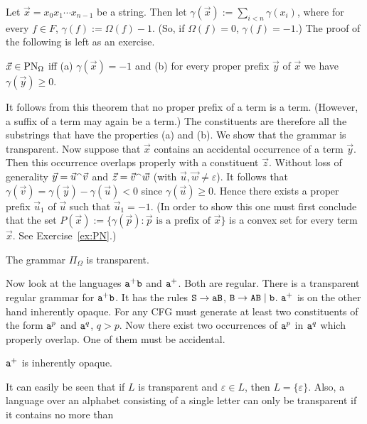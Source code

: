 Let $\vec{x} = x_0 x_1 \dotsb x_{n-1}$ be a string. Then let
$\gamma(\vec{x}) := \sum_{i < n} \gamma(x_i)$,
where for every $f \in F$, $\gamma(f) := \Omega(f) - 1$.
(So, if $\Omega(f) = 0$, $\gamma(f) = -1$.)
The proof of the following is left as an exercise. 
\begin{lem}
\label{lem:zahl}%
$\vec{x} \in \operatorname{PN}_{\Omega}$ iff (a) $\gamma(\vec{x}) = -1$ 
and (b) for every proper prefix $\vec{y}$ of $\vec{x}$ we have 
$\gamma(\vec{y}) \geq 0$.
\end{lem}
It follows from this theorem that no proper prefix of a
term is a term. (However, a suffix of a term may again be a term.) 
The constituents are therefore all the substrings that have the 
properties (a) and (b). We show that the grammar is transparent.
Now suppose that $\vec{x}$ contains an accidental occurrence of a 
term $\vec{y}$. Then this occurrence overlaps properly with a 
constituent $\vec{z}$. Without loss of generality $\vec{y} = 
\vec{u} {^{\smallfrown}} \vec{v}$ and $\vec{z} = \vec{v} {^{\smallfrown}} \vec{w}$ 
(with $\vec{u}, \vec{w} \neq \varepsilon$). It follows that
$\gamma(\vec{v}) = \gamma(\vec{y}) - \gamma(\vec{u})
< 0$ since $\gamma(\vec{u}) \geq 0$. Hence there exists a
proper prefix  $\vec{u}_1$ of $\vec{u}$ such that
$\vec{u}_1 = -1$. (In order to show this one must first conclude
that the set $P(\vec{x}) := \{\gamma(\vec{p}) : 
\vec{p} \mbox{ is a prefix of } \vec{x}\}$ is a convex set
for every term $\vec{x}$. See Exercise~\ref{ex:PN}.)
\begin{thm}
\label{thm:pn}
The grammar $\Pi_{\Omega}$ is transparent.
\proofend
\end{thm}
Now look at the languages $\mbox{\tt a}^+\mbox{\tt b}$ and
$\mbox{\tt a}^+$. Both are regular. There is a transparent 
regular grammar for $\mbox{\tt a}^+\mbox{\tt b}$. It has the rules 
$\mbox{\tt S} \rightarrow \mbox{\tt aB}$, $\mbox{\tt B} \rightarrow \mbox{\tt AB} 
\mid \mbox{\tt b}$. $\mbox{\tt a}^+$ is on the other hand inherently 
opaque.  For any CFG must generate at least two constituents of the  
form $\mbox{\tt a}^p$ and $\mbox{\tt a}^q$, $q > p$. 
Now there exist two occurrences of $\mbox{\tt a}^p$ in 
$\mbox{\tt a}^q$ which properly overlap. One of them must be
accidental.
\begin{prop}
$\mbox{\tt a}^+$ is inherently opaque.
\proofend
\end{prop}
It can easily be seen that if $L$ is transparent and
$\varepsilon \in L$, then $L = \{\varepsilon\}$.
Also, a language over an alphabet consisting of a single letter
can only be transparent if it contains no more than
